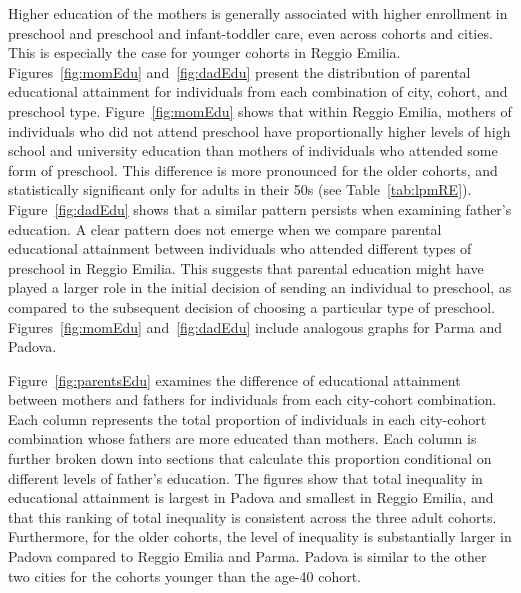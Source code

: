 Higher education of the mothers is generally associated with higher enrollment in preschool and preschool and infant-toddler care, even across cohorts and cities. This is especially the case for younger cohorts in Reggio Emilia. Figures~\ref{fig:momEdu} and~\ref{fig:dadEdu} present the distribution of parental educational attainment for individuals from each combination of city, cohort, and preschool type. Figure~\ref{fig:momEdu} shows that within Reggio Emilia, mothers of individuals who did not attend preschool have proportionally higher levels of high school and university education than mothers of individuals who attended some form of preschool. This difference is more pronounced for the older cohorts, and statistically significant only for adults in their 50s (see Table~\ref{tab:lpmRE}). Figure~\ref{fig:dadEdu} shows that a similar pattern persists when examining father's education. A clear pattern does not emerge when we compare parental educational attainment between individuals who attended different types of preschool in Reggio Emilia. This suggests that parental education might have played a larger role in the initial decision of sending an individual to preschool, as compared to the subsequent decision of choosing a particular type of preschool. Figures~\ref{fig:momEdu} and~\ref{fig:dadEdu} include analogous graphs for Parma and Padova.

Figure~\ref{fig:parentsEdu} examines the difference of educational attainment between mothers and fathers for individuals from each city-cohort combination. Each column represents the total proportion of individuals in each city-cohort combination whose fathers are more educated than mothers. Each column is further broken down into sections that calculate this proportion conditional on different levels of father's education. The figures show that total inequality in educational attainment is largest in Padova and smallest in Reggio Emilia, and that this ranking of total inequality is consistent across the three adult cohorts. Furthermore, for the older cohorts, the level of inequality is substantially larger in Padova compared to Reggio Emilia and Parma. Padova is similar to the other two cities for the cohorts younger than the age-40 cohort. 


